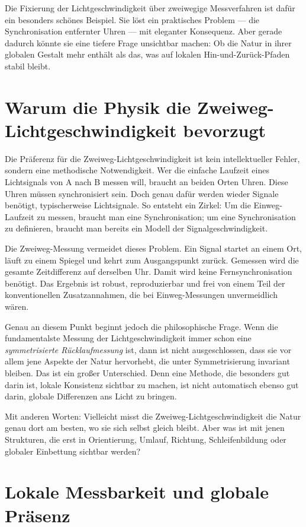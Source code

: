 \documentclass[11pt,a4paper]{article}
\theoremstyle{remark}
\begin{document}
	Die Fixierung der Lichtgeschwindigkeit über zweiwegige Messverfahren ist dafür ein besonders schönes Beispiel. Sie löst ein praktisches Problem --- die Synchronisation entfernter Uhren --- mit eleganter Konsequenz. Aber gerade dadurch könnte sie eine tiefere Frage unsichtbar machen: Ob die Natur in ihrer globalen Gestalt mehr enthält als das, was auf lokalen Hin-und-Zurück-Pfaden stabil bleibt.
	
	\section{Warum die Physik die Zweiweg-Lichtgeschwindigkeit bevorzugt}
	
	Die Präferenz für die Zweiweg-Lichtgeschwindigkeit ist kein intellektueller Fehler, sondern eine methodische Notwendigkeit. Wer die einfache Laufzeit eines Lichtsignals von A nach B messen will, braucht an beiden Orten Uhren. Diese Uhren müssen synchronisiert sein. Doch genau dafür werden wieder Signale benötigt, typischerweise Lichtsignale. So entsteht ein Zirkel: Um die Einweg-Laufzeit zu messen, braucht man eine Synchronisation; um eine Synchronisation zu definieren, braucht man bereits ein Modell der Signalgeschwindigkeit.
	
	Die Zweiweg-Messung vermeidet dieses Problem. Ein Signal startet an einem Ort, läuft zu einem Spiegel und kehrt zum Ausgangspunkt zurück. Gemessen wird die gesamte Zeitdifferenz auf derselben Uhr. Damit wird keine Fernsynchronisation benötigt. Das Ergebnis ist robust, reproduzierbar und frei von einem Teil der konventionellen Zusatzannahmen, die bei Einweg-Messungen unvermeidlich wären.
	
	Genau an diesem Punkt beginnt jedoch die philosophische Frage. Wenn die fundamentalste Messung der Lichtgeschwindigkeit immer schon eine \emph{symmetrisierte Rücklaufmessung} ist, dann ist nicht ausgeschlossen, dass sie vor allem jene Aspekte der Natur hervorhebt, die unter Symmetrisierung invariant bleiben. Das ist ein großer Unterschied. Denn eine Methode, die besonders gut darin ist, lokale Konsistenz sichtbar zu machen, ist nicht automatisch ebenso gut darin, globale Differenzen ans Licht zu bringen.
	
	Mit anderen Worten: Vielleicht misst die Zweiweg-Lichtgeschwindigkeit die Natur genau dort am besten, wo sie sich selbst gleich bleibt. Aber was ist mit jenen Strukturen, die erst in Orientierung, Umlauf, Richtung, Schleifenbildung oder globaler Einbettung sichtbar werden?
	
	\section{Lokale Messbarkeit und globale Präsenz}
	
\end{document}
